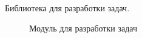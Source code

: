 Библиотека для разработки задач.

\begin{figure}[h]
\caption{Модуль для разработки задач}
\label{package_diagram_development}
\end{figure}